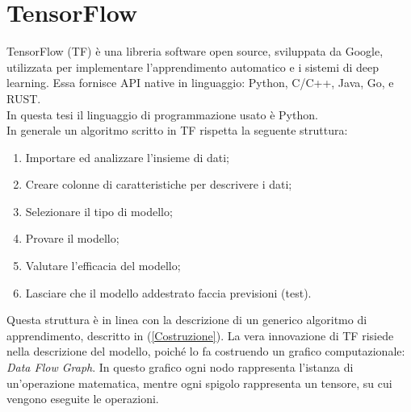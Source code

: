 \documentclass[a4paper,12pt,oneside]{book}
\begin{document}
\chapter{TensorFlow}
TensorFlow (TF) \`{e} una libreria software open source, sviluppata da Google, utilizzata per implementare l'apprendimento automatico e i sistemi di deep learning. Essa fornisce API native in linguaggio: Python, C/C++, Java, Go, e RUST.\\
In questa tesi il linguaggio di programmazione usato \`{e} Python.\\
In generale un algoritmo scritto in TF rispetta la seguente struttura:
\begin{enumerate}
\item Importare ed analizzare l'insieme di dati;
\item Creare colonne di caratteristiche per descrivere i dati;
\item Selezionare il tipo di modello;
\item Provare il modello;
\item Valutare l'efficacia del modello;
\item Lasciare che il modello addestrato faccia previsioni (test).
\end{enumerate}
Questa struttura \`{e} in linea con la descrizione di un generico algoritmo di apprendimento, descritto in (\ref{Costruzione}). La vera innovazione di TF risiede nella descrizione del modello, poich\'{e} lo fa costruendo un grafico computazionale: \textit{Data Flow Graph}. In questo grafico ogni nodo rappresenta l'istanza di un'operazione matematica, mentre ogni spigolo rappresenta un tensore, su cui vengono eseguite le operazioni.
\newpage
\end{document}
